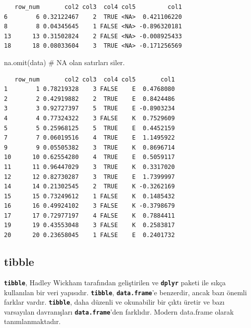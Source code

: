\documentclass[
  letterpaper,
  DIV=11,
  numbers=noendperiod]{scrreprt}
\newenvironment{Shaded}{\begin{snugshade}}{\end{snugshade}}
\newcommand{\CommentTok}[1]{\textcolor[rgb]{0.37,0.37,0.37}{#1}}
\newcommand{\FunctionTok}[1]{\textcolor[rgb]{0.28,0.35,0.67}{#1}}
\newcommand{\NormalTok}[1]{\textcolor[rgb]{0.00,0.23,0.31}{#1}}
\begin{document}
\begin{verbatim}
   row_num       col2 col3  col4 col5         col1
6        6 0.32122467    2  TRUE <NA>  0.421106220
8        8 0.04345645    1 FALSE <NA> -0.896320181
13      13 0.31502824    2 FALSE <NA> -0.008925433
18      18 0.08033604    3  TRUE <NA> -0.171256569
\end{verbatim}

\begin{Shaded}
\begin{Highlighting}[]
\FunctionTok{na.omit}\NormalTok{(data) }\CommentTok{\# NA olan satırları siler.}
\end{Highlighting}
\end{Shaded}

\begin{verbatim}
   row_num       col2 col3  col4 col5       col1
1        1 0.78219328    3 FALSE    E  0.4768080
2        2 0.42919882    2  TRUE    E  0.8424486
3        3 0.92727397    5  TRUE    E -0.8903234
4        4 0.77324322    3 FALSE    K  0.7529609
5        5 0.25968125    5  TRUE    E  0.4452159
7        7 0.06019516    4  TRUE    E  1.1495922
9        9 0.05505382    3  TRUE    K  0.8696714
10      10 0.62554280    4  TRUE    E  0.5059117
11      11 0.96447029    3  TRUE    K  0.3317020
12      12 0.82730287    3  TRUE    E  1.7399997
14      14 0.21302545    2  TRUE    K -0.3262169
15      15 0.73249612    1 FALSE    K  0.1485432
16      16 0.49924102    3 FALSE    K -0.3798679
17      17 0.72977197    4 FALSE    K  0.7884411
19      19 0.43553048    3 FALSE    K  0.2583817
20      20 0.23658045    1 FALSE    E  0.2401732
\end{verbatim}

\hypertarget{tibble}{%
\subsection{tibble}\label{tibble}}

\textbf{\texttt{tibble}}, Hadley Wickham tarafından geliştirilen ve
\textbf{\texttt{dplyr}} paketi ile sıkça kullanılan bir veri yapısıdır.
\textbf{\texttt{tibble}}, \textbf{\texttt{data.frame}}'e benzerdir,
ancak bazı önemli farklar vardır. \textbf{\texttt{tibble}}, daha düzenli
ve okunabilir bir çıktı üretir ve bazı varsayılan davranışları
\textbf{\texttt{data.frame}}'den farklıdır. Modern data.frame olarak
tanımlanmaktadır.
\end{document}
